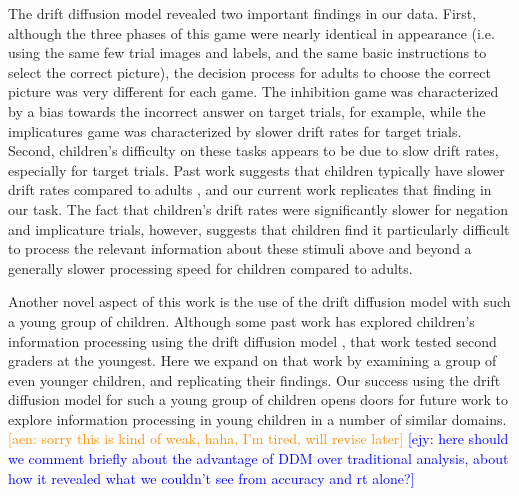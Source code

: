 \documentclass[10pt,letterpaper]{article}
\newcommand{\ejy}[1]{\textcolor{Blue}{[ejy: #1]}}
\newcommand{\aen}[1]{\textcolor{DarkOrange}{[aen: #1]}}
\begin{document}
The drift diffusion model revealed two important findings in our data.  First, although the three phases of this game were nearly identical in appearance (i.e. using the same few trial images and labels, and the same basic instructions to select the correct picture), the decision process for adults to choose the correct picture was very different for each game.  The inhibition game was characterized by a bias towards the incorrect answer on target trials, for example, while the implicatures game was characterized by slower drift rates for target trials.  Second, children's difficulty on these tasks appears to be due to slow drift rates, especially for target trials.  Past work suggests that children typically have slower drift rates compared to adults \cite{ratcliff2012}, and our current work replicates that finding in our task.  The fact that children's drift rates were significantly slower for negation and implicature trials, however, suggests that children find it particularly difficult to process the relevant information about these stimuli above and beyond a generally slower processing speed for children compared to adults.

Another novel aspect of this work is the use of the drift diffusion model with such a young group of children.  Although some past work has explored children's information processing using the drift diffusion model \cite{ratcliff2012}, that work tested second graders at the youngest.  Here we expand on that work by examining a group of even younger children, and replicating their findings.  Our success using the drift diffusion model for such a young group of children opens doors for future work to explore information processing in young children in a number of similar domains.  \aen{sorry this is kind of weak, haha, I'm tired, will revise later} \ejy{here should we comment briefly about the advantage of DDM over traditional analysis, about how it revealed what we couldn't see from accuracy and rt alone?}

%



\setlength{\bibleftmargin}{.125in}
\setlength{\bibindent}{-\bibleftmargin}


\end{document}
